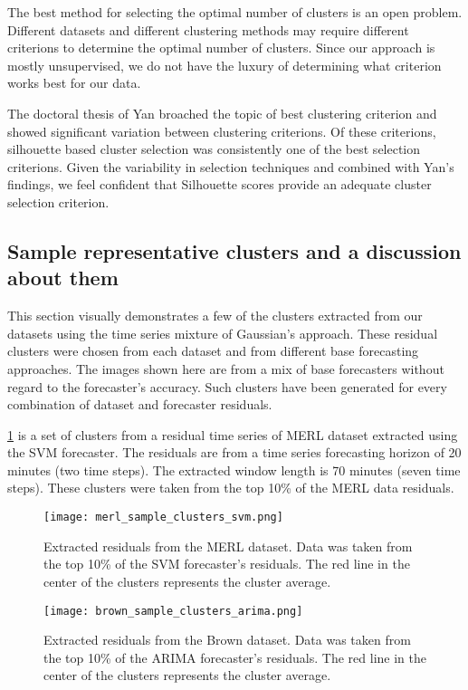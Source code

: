 The best method for selecting the optimal number of clusters is an open problem.  Different datasets and different clustering methods may require different criterions to determine the optimal number of clusters.  Since our approach is mostly unsupervised, we do not have the luxury of determining what criterion works best for our data.   

The doctoral thesis \cite{Yan2005} of Yan broached the topic of best clustering criterion and showed significant variation between clustering criterions.  Of these criterions, silhouette based cluster selection was consistently one of the best selection criterions.  Given the variability in selection techniques and combined with Yan's findings, we feel confident that Silhouette scores provide an adequate cluster selection criterion.

\subsection{Sample representative clusters and a discussion about them}

This section visually demonstrates a few of the clusters extracted from our datasets using the time series mixture of Gaussian's approach.  These residual clusters were chosen from each dataset and from different base forecasting approaches.  The images shown here are from a mix of base forecasters without regard to the forecaster's accuracy.  Such clusters have been generated for every combination of dataset and forecaster residuals.

\ref{fig:merl_clusters} is a set of clusters from a residual time series of MERL dataset extracted using the SVM forecaster.  The residuals are from a time series forecasting horizon of 20 minutes (two time steps).  The extracted window length is 70 minutes (seven time steps).  These clusters were taken from the top 10\% of the MERL data residuals.

\begin{figure}
	\begin{center}
		\texttt{[image: merl\_sample\_clusters\_svm.png]}
	\end{center}
	\caption{Extracted residuals from the MERL dataset.  Data was taken from the top 10\% of the SVM forecaster's residuals.  The red line in the center of the clusters represents the cluster average.}
	\label{fig:merl_clusters}
\end{figure}

\begin{figure}
	\begin{center}
		\texttt{[image: brown\_sample\_clusters\_arima.png]}
	\end{center}
	\caption{Extracted residuals from the Brown dataset.  Data was taken from the top 10\% of the ARIMA forecaster's residuals.  The red line in the center of the clusters represents the cluster average.}
	\label{fig:brown_clusters}
\end{figure}

